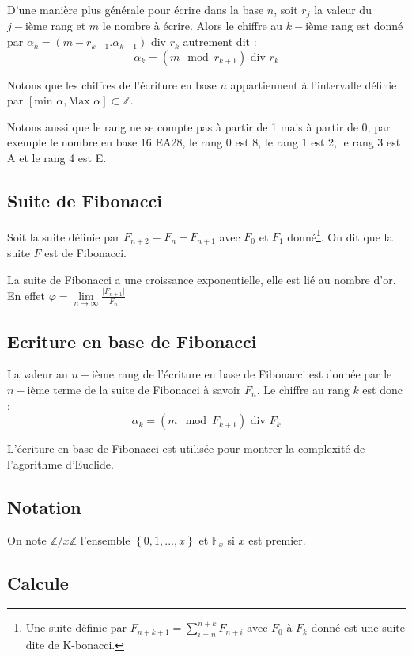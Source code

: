 \documentclass[a4paper,10pt]{article}
\begin{document}
D'une manière plus générale pour écrire dans la base $n$, soit $r_j$ la valeur du $j-\mbox{ième}$ rang et $m$ le nombre à écrire. Alors le chiffre au $k-\mbox{ième}$ rang est donné par $\alpha_k = (m - r_{k-1}.\alpha_{k-1}) \mbox{ div } r_k$ autrement dit : 
$$\alpha_k = (m \mod r_{k+1}) \mbox{ div } r_k$$

Notons que les chiffres de l'écriture en base $n$ appartiennent à l'intervalle définie par $\left[ \mbox{min } \alpha , \mbox{Max } \alpha \right] \subset \mathbb{Z}$.

Notons aussi que le rang ne se compte pas à partir de 1 mais à partir de 0, par exemple le nombre en base 16 EA28, le rang 0 est 8, le rang 1 est 2, le rang 3 est A et le rang 4 est E.
\subsection{Suite de Fibonacci}
Soit la suite définie par $F_{n+2} = F_n + F_{n+1}$ avec $F_0$ et $F_1$ donné\footnote{Une suite définie par $F_{n+k+1} = \sum_{i=n}^{n+k} F_{n+i}$ avec $F_0$ à $F_k$ donné est une suite dite de K-bonacci.}. On dit que la suite $F$ est de Fibonacci.

La suite de Fibonacci a une croissance exponentielle, elle est lié au nombre d'or. En effet $\varphi = \lim\limits_{n \rightarrow \infty} \frac{\vert F_{n+1} \vert}{\vert F_n \vert}$

\newpage

\subsection{Ecriture en base de Fibonacci}
La valeur au $n-\mbox{ième}$ rang de l'écriture en base de Fibonacci est donnée par le $n-\mbox{ième}$ terme de la suite de Fibonacci à savoir $F_n$. Le chiffre au rang $k$ est donc :
$$\alpha_k = (m \mod F_{k+1}) \mbox{ div } F_k$$

L'écriture en base de Fibonacci est utilisée pour montrer la complexité de l'agorithme d'Euclide.

\subsection{Notation}

On note $\mathbb{Z} / x \mathbb{Z}$ l'ensemble $\left\lbrace 0, 1, ... , x \right\rbrace$ et $\mathbb{F}_{x}$ si $x$ est premier.

\subsection{Calcule}
\end{document}
